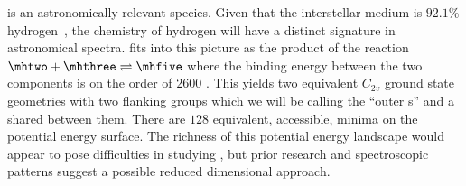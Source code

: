 %
%

\hfive{} is an astronomically relevant species. Given that the interstellar medium is \squigg$92.1\%$ hydrogen~\cite{Anders1982}, the chemistry of hydrogen will have a distinct signature in astronomical spectra. \hfive{} fits into this picture as the product of the reaction $\mhtwo + \mhthree \rightleftharpoons \mhfive$ where the binding energy between the two components is on the order of $2600$ \wavenumbers{}. This yields two equivalent $C_{2v}$ ground state geometries with two flanking \htwo{} groups which we will be calling the ``outer \htwo{}s'' and a \hplus{} shared between them. There are $128$ equivalent, accessible, minima on the \hfive{} potential energy surface. The richness of this potential energy landscape would appear to pose difficulties in studying \hfive{}, but prior research and spectroscopic patterns suggest a possible reduced dimensional approach.

%
